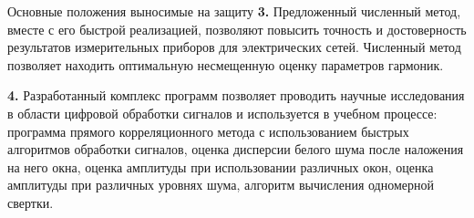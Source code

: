 \begin{frame}{Основные положения выносимые на защиту}
	\textbf{3.} Предложенный численный метод, вместе с его быстрой реализацией, позволяют повысить точность и достоверность результатов измерительных приборов для электрических сетей. Численный метод позволяет находить оптимальную несмещенную оценку параметров гармоник.

	\textbf{4.} Разработанный комплекс программ позволяет проводить научные исследования в области цифровой обработки сигналов и используется в учебном процессе: программа прямого корреляционного метода с использованием быстрых алгоритмов обработки сигналов, оценка дисперсии белого шума после наложения на него окна, оценка амплитуды при использовании различных окон, оценка амплитуды при различных уровнях шума, алгоритм вычисления одномерной свертки.
\end{frame}